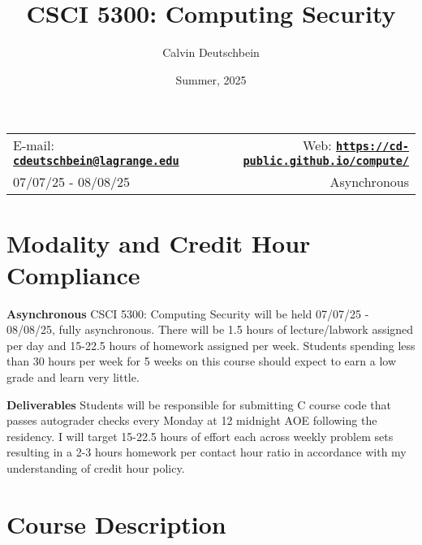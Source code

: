\documentclass[11pt]{article}
\title{CSCI 5300: Computing Security}
\author{Calvin Deutschbein}
\date{Summer, 2025}
\newcommand{\blankline}{\quad\pagebreak[2]}
\begin{document}
\maketitle

\blankline

\begin{tabular*}{\textwidth}{@{\extracolsep{\fill}}lr}


E-mail: \href{mailto:cdeutschbein@lagrange.edu}{\tt\bf cdeutschbein@lagrange.edu} & Web: \href{https://cd-public.github.io/compute/}{\tt\bf https://cd-public.github.io/compute/}  \\

07/07/25 - 08/08/25 &  Asynchronous \\
\hline
\end{tabular*}

\vspace{5 mm}


\section*{Modality and Credit Hour Compliance}


\textbf{Asynchronous} CSCI 5300: Computing Security will be held 07/07/25 - 08/08/25, fully asynchronous.  There will be 1.5 hours of lecture/labwork assigned per day and 15-22.5 hours of homework assigned per week. Students spending less than 30 hours per week for 5 weeks on this course should expect to earn a low grade and learn very little. 

\bigskip

\textbf{Deliverables} Students will be responsible for submitting C course code that passes autograder checks every Monday at 12 midnight AOE following the residency. I will target 15-22.5 hours of effort each across weekly problem sets resulting in a 2-3 hours homework per contact hour ratio in accordance with my understanding of credit hour policy.


\section*{Course Description}
\end{document}
